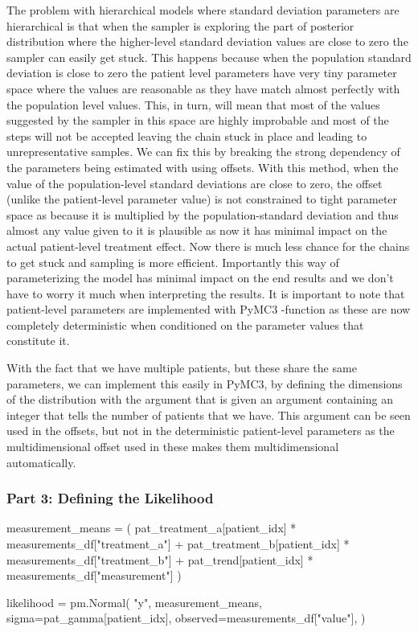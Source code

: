 \documentclass[12pt,a4paper,leqno]{report}
\theoremstyle{plain}
\theoremstyle{definition}
\theoremstyle{remark}
\begin{document}
The problem with hierarchical
models where standard deviation parameters are hierarchical is that when the sampler is
exploring the part of posterior distribution where the higher-level standard deviation values
are close to zero the sampler can easily get stuck. This happens because
when the population standard deviation is close to zero the patient level parameters
have very tiny parameter space where the values are reasonable as they have match almost
perfectly with the population level values. This, in turn, will mean
that most of the values suggested by the sampler in this space are highly improbable and
most of the steps will not be accepted leaving the chain stuck in place and leading to
unrepresentative samples. We can fix this by breaking the strong dependency of the
parameters being estimated with using offsets. With this method, when the value of the
population-level standard deviations are close to zero, the offset (unlike the
patient-level parameter value) is not constrained to tight parameter space as because it is
multiplied by the population-standard deviation and thus almost any value given to it is
plausible as now it has minimal impact on the actual patient-level treatment effect.
Now there is much less chance for the chains to get stuck and sampling is more
efficient. Importantly this way of parameterizing the model has minimal impact on the end
results and we don't have to worry it much when interpreting the results. It is
important to note that patient-level parameters are implemented with PyMC3
-function as these are now completely deterministic when conditioned
on the parameter values that constitute it.\cite{offset}

With the fact that we have multiple patients, but these share the same parameters,
we can implement this easily in PyMC3, by defining the dimensions of the distribution
with the  argument that is given an argument containing an integer that tells
the number of patients that we have. This argument can be seen used in the offsets, but not in the
deterministic patient-level parameters as the multidimensional offset used in these
makes them multidimensional automatically.

\subsubsection*{Part 3: Defining the Likelihood}

\bigskip
\begin{pyverbatim}[][fontsize=\footnotesize]
    measurement_means = (
        pat_treatment_a[patient_idx] * measurements_df["treatment_a"]
        + pat_treatment_b[patient_idx] * measurements_df["treatment_b"]
        + pat_trend[patient_idx] * measurements_df["measurement"]
    )

    likelihood = pm.Normal(
        "y",
        measurement_means,
        sigma=pat_gamma[patient_idx],
        observed=measurements_df["value"],
    )
\end{pyverbatim}
\smallskip
\end{document}
